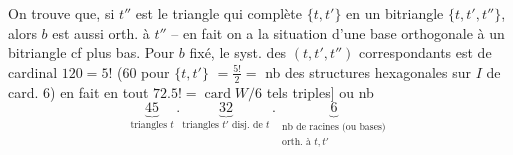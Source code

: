On trouve que, si $t''$ est le triangle qui complète $\{t,t'\}$ en un bitriangle $\{t,t',t''\}$, alors $b$ est aussi orth. à $t''$ -- en fait on a la situation d'une base orthogonale à un bitriangle cf plus bas. Pour $b$ fixé, le syst. des $(t,t',t'')$ correspondants est de cardinal $120=5!$ (60 pour $\{t,t'\}$ $=\frac{5!}{2}=$ nb des structures hexagonales sur $I$ de card. 6) en fait en tout  $72.5!=\operatorname{card}W/6$ \inserted{$\downarrow$} tels triples]
ou nb 
\[
\underbrace{45}_{\text{triangles }t}\,.\,\underbrace{32}_{\text{triangles }t'\text{ disj. de }t}\,.\,
\underbrace{6}_{\substack{\text{nb de racines (ou bases)}\\\text{orth. à }t,t'}}
\]
